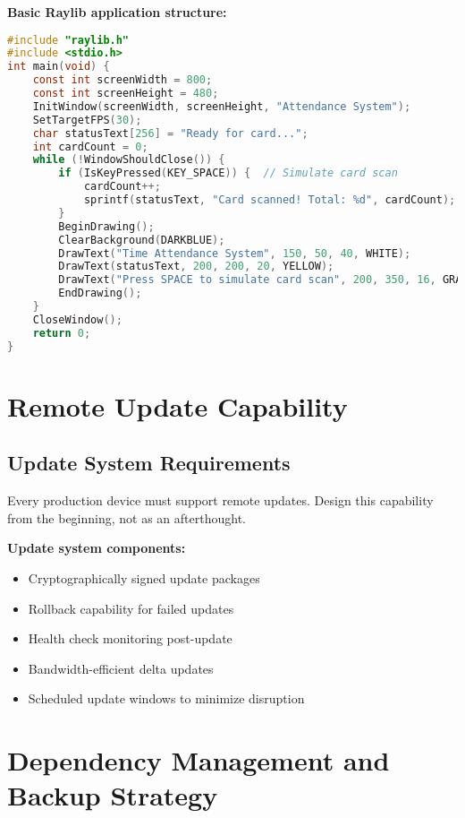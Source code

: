 \textbf{Basic Raylib application structure:}
\begin{tcolorbox}[colback=gray!5,colframe=gray!50,title=Simple Attendance Display]
\begin{lstlisting}[language=C,basicstyle=\footnotesize\ttfamily]
#include "raylib.h"
#include <stdio.h>
int main(void) {
    const int screenWidth = 800;
    const int screenHeight = 480;
    InitWindow(screenWidth, screenHeight, "Attendance System");
    SetTargetFPS(30);
    char statusText[256] = "Ready for card...";
    int cardCount = 0;
    while (!WindowShouldClose()) {
        if (IsKeyPressed(KEY_SPACE)) {  // Simulate card scan
            cardCount++;
            sprintf(statusText, "Card scanned! Total: %d", cardCount);
        }
        BeginDrawing();
        ClearBackground(DARKBLUE);
        DrawText("Time Attendance System", 150, 50, 40, WHITE);
        DrawText(statusText, 200, 200, 20, YELLOW);
        DrawText("Press SPACE to simulate card scan", 200, 350, 16, GRAY);
        EndDrawing();
    }
    CloseWindow();
    return 0;
}
\end{lstlisting}
\end{tcolorbox}

\section{Remote Update Capability}

\subsection{Update System Requirements}

Every production device must support remote updates. Design this capability from the beginning, not as an afterthought.

\textbf{Update system components:}
\begin{itemize}
\item Cryptographically signed update packages
\item Rollback capability for failed updates
\item Health check monitoring post-update
\item Bandwidth-efficient delta updates
\item Scheduled update windows to minimize disruption
\end{itemize}

\section{Dependency Management and Backup Strategy}

